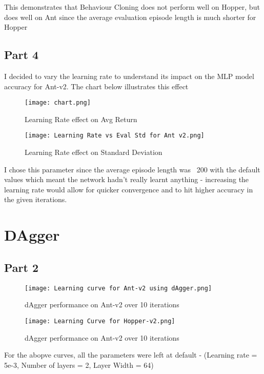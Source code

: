 \documentclass{article}
\begin{document}
This demonstrates that Behaviour Cloning does not perform well on Hopper, but does well on Ant since the average evaluation episode length is much shorter for Hopper
\subsection{Part 4}

I decided to vary the learning rate to understand its impact on the MLP model accuracy for Ant-v2. The chart below illustrates this effect

\begin{figure}[h]
    \centering
    \texttt{[image: chart.png]}
    \caption{Learning Rate effect on Avg Return}
    \label{fig:enter-label}
\end{figure}

\begin{figure}[h]
    \centering
    \texttt{[image: Learning Rate vs Eval Std for Ant v2.png]}
    \caption{Learning Rate effect on Standard Deviation}
    \label{fig:enter-label}
\end{figure}

I chose this parameter since the average episode length was ~200 with the default values which meant the network hadn't really learnt anything - increasing the learning rate would allow for quicker convergence and to hit higher accuracy in the given iterations.

\section{DAgger}
\subsection{Part 2}

\begin{figure}[h]
    \centering
    \texttt{[image: Learning curve for Ant-v2 using dAgger.png]}
    \caption{dAgger performance on Ant-v2 over 10 iterations}
    \label{fig:enter-label}
\end{figure}

\begin{figure}[h]
    \centering
    \texttt{[image: Learning Curve for Hopper-v2.png]}
    \caption{dAgger performance on Ant-v2 over 10 iterations}
    \label{fig:enter-label}
\end{figure}

For the abopve curves, all the parameters were left at default - (Learning rate = 5e-3, Number of layers = 2, Layer Width = 64)
\end{document}
